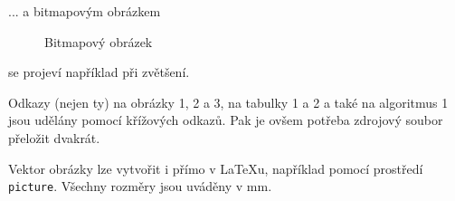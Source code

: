 \documentclass[11pt,a4paper]{article}
\begin{document}
... a bitmapovým obrázkem


\begin{figure}[ht]
  \begin{center}
    \caption{Bitmapový obrázek}
  \end{center}
\end{figure}


se projeví například při zvětšení.

Odkazy (nejen ty) na obrázky 1, 2 a 3, na tabulky 1 a 2 a také na algoritmus 1 jsou udělány pomocí křížových odkazů. Pak je ovšem potřeba zdrojový soubor přeložit dvakrát.

Vektor obrázky lze vytvořit i přímo v \LaTeX u, například pomocí prostředí \texttt{picture}. Všechny rozměry jsou uváděny v mm.

\newpage
\end{document}
